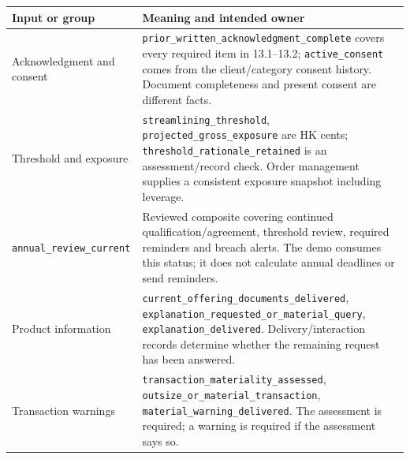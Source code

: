 \documentclass[12pt,a4paper,oneside,openany]{book}
\begin{document}
\endgroup
\begin{longtable}{P{0.30\textwidth}P{0.60\textwidth}}

\toprule Input or group & Meaning and intended owner \\\midrule
\endhead
Acknowledgment and consent & \texttt{prior\_written\_acknowledgment\_complete} covers every required item in 13.1--13.2; \texttt{active\_consent} comes from the client/category consent history. Document completeness and present consent are different facts.\\
Threshold and exposure & \texttt{streamlining\_threshold}, \texttt{projected\_gross\_exposure} are HK cents; \texttt{threshold\_rationale\_retained} is an assessment/record check. Order management supplies a consistent exposure snapshot including leverage.\\
\texttt{annual\_review\_current} & Reviewed composite covering continued qualification/agreement, threshold review, required reminders and breach alerts. The demo consumes this status; it does not calculate annual deadlines or send reminders.\\
Product information & \texttt{current\_offering\_documents\_delivered}, \texttt{explanation\_requested\_or\_material\_query}, \texttt{explanation\_delivered}. Delivery/interaction records determine whether the remaining request has been answered.\\
Transaction warnings & \texttt{transaction\_materiality\_assessed}, \texttt{outsize\_or\_material\_transaction}, \texttt{material\_warning\_delivered}. The assessment is required; a warning is required if the assessment says so.\\
\bottomrule
\end{longtable}
\endgroup
\end{document}
